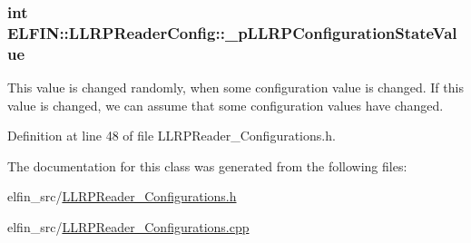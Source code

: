 \hypertarget{class_e_l_f_i_n_1_1_l_l_r_p_reader_config_a5fee5f1463166944eb78a26d2b39858d}{
\subsubsection[{\-\_\-p\-L\-L\-R\-P\-Configuration\-State\-Value}]{\setlength{\rightskip}{0pt plus 5cm}int E\-L\-F\-I\-N\-::\-L\-L\-R\-P\-Reader\-Config\-::\-\_\-p\-L\-L\-R\-P\-Configuration\-State\-Value}}\label{class_e_l_f_i_n_1_1_l_l_r_p_reader_config_a5fee5f1463166944eb78a26d2b39858d}


This value is changed randomly, when some configuration value is changed. If this value is changed, we can assume that some configuration values have changed. 



Definition at line 48 of file L\-L\-R\-P\-Reader\-\_\-\-Configurations.\-h.



The documentation for this class was generated from the following files\-:\begin{DoxyCompactItemize}
\item 
elfin\-\_\-src/\hyperlink{_l_l_r_p_reader___configurations_8h}{L\-L\-R\-P\-Reader\-\_\-\-Configurations.\-h}\item 
elfin\-\_\-src/\hyperlink{_l_l_r_p_reader___configurations_8cpp}{L\-L\-R\-P\-Reader\-\_\-\-Configurations.\-cpp}\end{DoxyCompactItemize}
